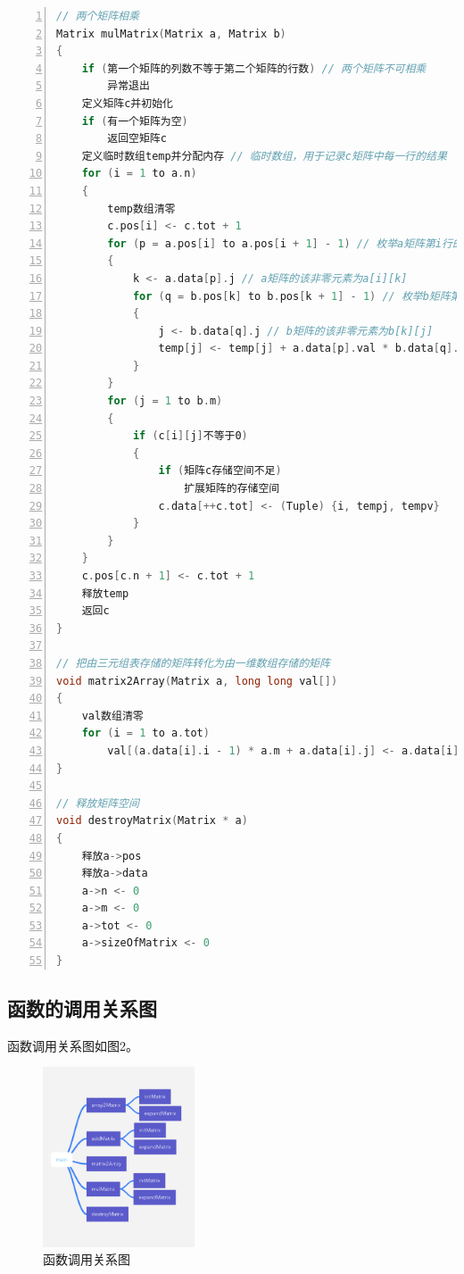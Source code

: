 \documentclass{article}
\begin{document}
\begin{lstlisting}[language={C},
    numbers=left,
    numberstyle=\tiny\consolas,
    basicstyle=\small\consolas]
// 两个矩阵相乘
Matrix mulMatrix(Matrix a, Matrix b)
{
    if (第一个矩阵的列数不等于第二个矩阵的行数) // 两个矩阵不可相乘
        异常退出
    定义矩阵c并初始化
    if (有一个矩阵为空)
        返回空矩阵c
    定义临时数组temp并分配内存 // 临时数组，用于记录c矩阵中每一行的结果
    for (i = 1 to a.n)
    {
        temp数组清零
        c.pos[i] <- c.tot + 1
        for (p = a.pos[i] to a.pos[i + 1] - 1) // 枚举a矩阵第i行的非零元素
        {
            k <- a.data[p].j // a矩阵的该非零元素为a[i][k]
            for (q = b.pos[k] to b.pos[k + 1] - 1) // 枚举b矩阵第k行的非零元素
            {
                j <- b.data[q].j // b矩阵的该非零元素为b[k][j]
                temp[j] <- temp[j] + a.data[p].val * b.data[q].val
            }
        }
        for (j = 1 to b.m)
        {
            if (c[i][j]不等于0) 
            {
                if (矩阵c存储空间不足)
                    扩展矩阵的存储空间
                c.data[++c.tot] <- (Tuple) {i, tempj, tempv}
            }
        }
    }
    c.pos[c.n + 1] <- c.tot + 1
    释放temp
    返回c
}

// 把由三元组表存储的矩阵转化为由一维数组存储的矩阵
void matrix2Array(Matrix a, long long val[])
{
    val数组清零
    for (i = 1 to a.tot)
        val[(a.data[i].i - 1) * a.m + a.data[i].j] <- a.data[i].val; // a[i][j]存储在val[(i-1]*m+j]中
}

// 释放矩阵空间
void destroyMatrix(Matrix * a)
{
    释放a->pos
    释放a->data
    a->n <- 0
    a->m <- 0
    a->tot <- 0
    a->sizeOfMatrix <- 0
}
\end{lstlisting}

\subsection{函数的调用关系图}

函数调用关系图如图2。

\begin{figure}[htbp]
    
    \centering\includegraphics[width=0.4\textwidth]{./Images/pic3_2.png}
    
    \caption{函数调用关系图}
    
\end{figure}
\end{document}
